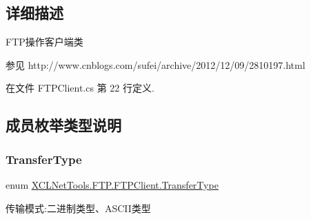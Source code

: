 \subsection{详细描述}
F\+T\+P操作客户端类 \begin{DoxySeeAlso}{参见}
http\+://www.\+cnblogs.\+com/sufei/archive/2012/12/09/2810197.\+html


\end{DoxySeeAlso}




在文件 F\+T\+P\+Client.\+cs 第 22 行定义.



\subsection{成员枚举类型说明}
\mbox{\label{class_x_c_l_net_tools_1_1_f_t_p_1_1_f_t_p_client_adef28404af1c916d9bd2bfbfa924b707}} 
\subsubsection{\texorpdfstring{Transfer\+Type}{TransferType}}
{\footnotesize\ttfamily enum \hyperlink{class_x_c_l_net_tools_1_1_f_t_p_1_1_f_t_p_client_adef28404af1c916d9bd2bfbfa924b707}{X\+C\+L\+Net\+Tools.\+F\+T\+P.\+F\+T\+P\+Client.\+Transfer\+Type}\hspace{0.3cm}{\ttfamily [strong]}}



传输模式\+:二进制类型、\+A\+S\+C\+I\+I类型 

